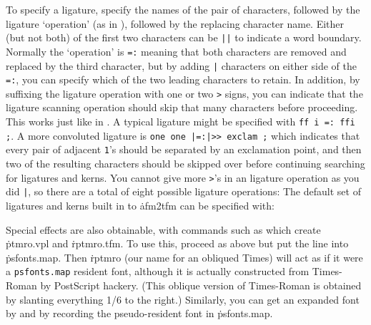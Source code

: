To specify a ligature, specify the names of the pair of characters,
followed by the ligature `operation' (as in \MF), followed by the
replacing character name.  Either (but not both) of the first two
characters can be {\tt ||} to indicate a word boundary.
Normally the `operation' is {\tt =:}
meaning that both characters are removed and replaced by the
third character, but by adding {\tt |} characters on either side of
the {\tt =:}, you can specify which of the two leading characters to
retain.  In addition, by suffixing the ligature operation with one
or two {\tt >} signs, you can indicate that the ligature scanning
operation should skip that many characters before proceeding.  This
works just like in \MF.  A typical ligature might be specified with
{\tt ff i =:{} ffi ;}.	A more convoluted ligature is
{\tt one one |=:|>> exclam ;} which indicates that every pair of
adjacent {\tt 1}'s should be separated by an exclamation point,
and then two of the resulting characters should be skipped over
before continuing searching for ligatures and kerns.  You cannot
give more {\tt >}'s in an ligature operation as you did {\tt |},
so there are a total of eight possible ligature operations:
\cmd{=: |=: |=:> =:| =:|> |=:| |=:|> |=:|>>}
\noindent
The default set of ligatures and kerns built in to \.{afm2tfm} can
be specified with:
{\vskip0pt\parskip=0pt
\endverb}


Special effects are also obtainable, with commands such as
\noindent
which create \.{ptmro.vpl} and \.{rptmro.tfm}.
To use this, proceed as above but put the line
\noindent
into \.{psfonts.map}.  Then \.{rptmro} (our name for an obliqued Times)
will act as if it were a
\^{{\tt psfonts.map}}
resident font, although it is actually constructed from Times-Roman
by PostScript hackery.	 (This oblique version of Times-Roman is obtained
by slanting everything 1/6 to the right.)
Similarly, you can get an expanded font by
\noindent
and by recording the pseudo-resident font
\noindent
in \.{psfonts.map}.

